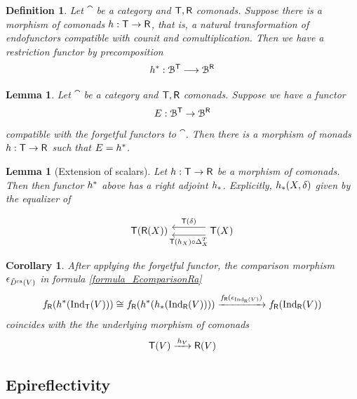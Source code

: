 \documentclass[a4paper, reqno]{amsart}
\newtheorem{corollary}[theorem]{Corollary}
\newtheorem{definition}[theorem]{Definition}
\newtheorem{lemma}[theorem]{Lemma}
\theoremstyle{introTheorems}
\renewcommand{\1}{\mathbbold{1}}
\begin{document}
\begin{definition}\label{def_comonadRestriction}
Let $\cat$ be a category and ${\mathsf{T}},{\mathsf{R}}$ comonads. Suppose there is a morphism of comonads $h:{\mathsf{T}}\rightarrow {\mathsf{R}}$, that is, a natural transformation of endofunctors compatible with counit and comultiplication. Then we have a restriction functor by precomposition  
$$h^*: \mathcal{B}^{\mathsf{T}}\longrightarrow \mathcal{B}^{\mathsf{R}}$$
\end{definition}
\begin{lemma}\label{lm_comonadRestriction}
Let $\cat$ be a category and ${\mathsf{T}},{\mathsf{R}}$ comonads. Suppose we have a functor
$$E: \mathcal{B}^{\mathsf{T}}\to \mathcal{B}^{\mathsf{R}}$$
compatible with the forgetful functors to $\cat$. Then there is a morphism of monads $h:{\mathsf{T}}\rightarrow {\mathsf{R}}$ such that $E=h^*$.
\end{lemma}
\begin{lemma}[Extension of scalars]\label{lm_comonadExtensionOfScalars}
    Let $h:{\mathsf{T}}\rightarrow {\mathsf{R}}$ be a morphism of comonads. Then then functor $h^*$ above has a right adjoint $h_*$. Explicitly, $h_*(X,\delta) $ given by the equalizer of

\[\begin{tikzcd}[row sep=6ex, column sep=8ex]
\monT(\monR(X))
\arrow[r, leftarrow, shift left=4pt,"\monT(\delta)"] 
\arrow[r, leftarrow, swap,shift right=4pt,"\monT(\fpullback_X)\circ \Delta^T_X"]
& 
\monT(X)
\end{tikzcd}\]
\end{lemma}

\begin{corollary}\label{cor:comonadComparisonPullback}
After applying the forgetful functor, the comparison morphism $\epsilon_{\tilde{D}^{\mathrm{ra}}(V)}$ in formula \eqref{formula_EcomparisonRa}
$$
f_{\mathsf{R}}(h^*(\textup{Ind}_{\mathsf{T}}(V)))
\cong
f_{\mathsf{R}}(h^*(h_*(\textup{Ind}_{{\mathsf{R}}}(V))))
\xrightarrow{f_{\mathsf{R}}(\epsilon_{\textup{Ind}_{{\mathsf{R}}}(V)})}
f_{\mathsf{R}}(\textup{Ind}_{{\mathsf{R}}}(V))
$$
coincides with the the underlying morphism of comonads
$$
{\mathsf{T}}(V)
\xrightarrow{\,h_V}
{\mathsf{R}}(V)
$$
\end{corollary}

\subsection{Epireflectivity}\label{subsec:Nakayama}
\end{document}
